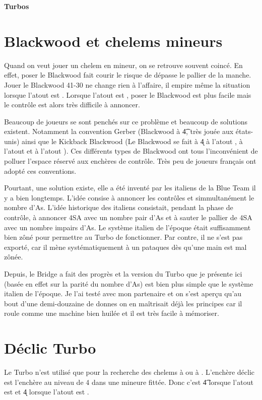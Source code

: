 \documentclass[a4paper,12pt]{article}
\begin{document}
\begin{center}
 \LARGE{\bf Turbos}
\end{center}



\section*{Blackwood et chelems mineurs}
Quand on veut jouer un chelem en mineur, on se retrouve souvent coincé.
En effet, poser le Blackwood fait courir le risque de dépasse le pallier de la manche. Jouer le Blackwood 41-30 ne change rien à l'affaire, il empire même la situation lorsque l'atout est \T.
Lorsque l'atout est \K, poser le Blackwood est plus facile mais le contrôle \T est alors très difficile à annoncer.

Beaucoup de joueurs se sont penchés sur ce problème et beaucoup de solutions existent. Notamment la convention Gerber (Blackwood à \t4, très jouée aux états-unis)
ainsi que le Kickback Blackwood (Le Blackwood se fait à \k4 à l'atout \T,  à l'atout \K et  à l'atout \C). Ces différents types de Blackwood ont tous l'inconvénient de polluer l'espace réservé aux enchères de contrôle. Très peu de joueurs français ont adopté ces conventions.

Pourtant, une solution existe, elle a été inventé par les italiens de la Blue Team il y a bien longtemps. L'idée consise à annoncer les contrôles et simmultanément le nombre d'As. L'idée historique des italiens consistait, pendant la phase de contrôle, à annoncer 4SA avec un nombre pair d'As et à sauter le pallier de 4SA avec un nombre impairs d'As. Le système italien de l'époque était suffisamment bien zôné pour permettre au Turbo de fonctionner. Par contre, il ne s'est pas exporté, car il mène systématiquement à un pataques dès qu'une main est mal zônée.

Depuis, le Bridge a fait des progrès et la version du Turbo que je présente ici (basée en effet sur la parité du nombre d'As) est bien plus simple que le système italien de l'époque. Je l'ai testé avec mon partenaire et on s'est aperçu qu'au bout d'une demi-douzaine de donnes on en maîtrisait déjà les principes car il roule comme une machine bien huilée et il est très facile à mémoriser.

\section*{Déclic Turbo}
Le Turbo n'est utilisé que pour la recherche des chelems à \T ou à \K. L'enchère déclic est l'enchère au niveau de 4 dans une mineure fittée. Donc c'est \t4 lorsque l'atout est \T et \k4 lorsque l'atout est \K.
\end{document}

